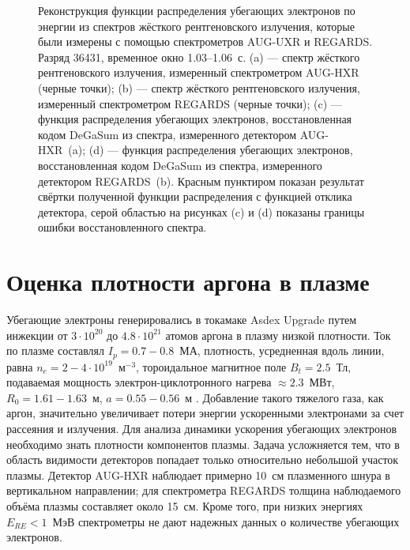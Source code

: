\begin{figure}[ht!]
  \caption{ Реконструкция функции распределения убегающих электронов по энергии из спектров жёсткого рентгеновского излучения, которые были измерены с помощью спектрометров AUG-UXR и REGARDS. Разряд 36431, временное окно 1.03--1.06~с. (a) --- спектр жёсткого рентгеновского излучения, измеренный спектрометром AUG-HXR (черные точки); (b) --- спектр жёсткого рентгеновского излучения, измеренный спектрометром REGARDS (черные точки); (c) --- функция распределения убегающих электронов, восстановленная кодом DeGaSum из спектра, измеренного детектором AUG-HXR~(a); (d) --- функция распределения убегающих электронов, восстановленная кодом DeGaSum из спектра, измеренного детектором REGARDS~(b). Красным пунктиром показан результат свёртки полученной функции распределения с функцией отклика детектора, серой областью на рисунках (c) и (d) показаны границы ошибки восстановленного спектра.~\cite{Shevelev2021} }
  \label{fig:asdexRegardsReSpectrumExamples}
\end{figure}

\FloatBarrier


\section{Оценка плотности аргона в плазме}


Убегающие электроны генерировались в токамаке Asdex Upgrade путем инжекции от $3 \cdot 10^{20}$ до $4.8 \cdot 10^{21}$ атомов аргона в плазму низкой плотности. Ток по плазме составлял $I_p = 0.7-0.8$~МА, плотность, усредненная вдоль линии, равна $n_e = 2-4 \cdot 10^{19}$~м${}^{-3}$, тороидальное магнитное поле $B_t = 2.5$~Тл, подаваемая мощность электрон-циклотронного нагрева $\approx 2.3$~МВт, $R_0 = 1.61-1.63$~м, $a = 0.55-0.56$~м \cite{Pautasso2020}. Добавление такого тяжелого газа, как аргон, значительно увеличивает потери энергии ускоренными электронами за счет рассеяния и излучения. Для анализа динамики ускорения убегающих электронов необходимо знать плотности компонентов плазмы. Задача усложняется тем, что в область видимости детекторов попадает только относительно небольшой участок плазмы. Детектор AUG-HXR наблюдает примерно 10~см плазменного шнура в вертикальном направлении; для спектрометра REGARDS толщина наблюдаемого объёма плазмы составляет около 15~см. Кроме того, при низких энергиях $E_{RE} < 1$~МэВ спектрометры не дают надежных данных о количестве убегающих электронов.~\cite{Shevelev2021}

